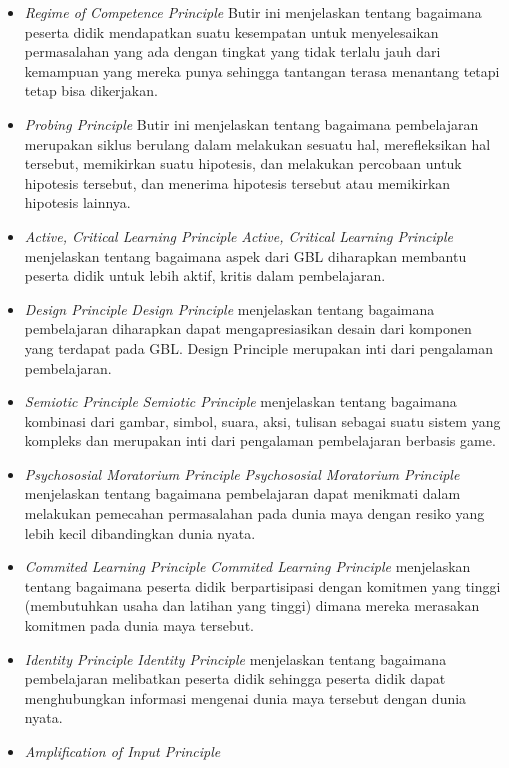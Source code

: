 	\begin{itemize}
		\item \textit{Regime of Competence Principle}
			\subitem Butir ini menjelaskan tentang bagaimana peserta didik mendapatkan suatu kesempatan untuk menyelesaikan permasalahan yang ada dengan tingkat yang tidak terlalu jauh dari kemampuan yang mereka punya sehingga tantangan terasa menantang tetapi tetap bisa dikerjakan.
		\item \textit{Probing Principle}
			\subitem Butir ini menjelaskan tentang bagaimana pembelajaran merupakan siklus berulang dalam melakukan sesuatu hal, merefleksikan hal tersebut, memikirkan suatu hipotesis, dan melakukan percobaan untuk hipotesis tersebut, dan menerima hipotesis tersebut atau memikirkan hipotesis lainnya.
		\item \textit{Active, Critical Learning Principle}
			\subitem \textit{Active, Critical Learning Principle} menjelaskan tentang bagaimana aspek dari GBL diharapkan membantu peserta didik untuk lebih aktif, kritis dalam pembelajaran.
		\item \textit{Design Principle}
			\subitem \textit{Design Principle} menjelaskan tentang bagaimana pembelajaran diharapkan dapat mengapresiasikan desain dari komponen yang terdapat pada GBL. Design Principle merupakan inti dari pengalaman pembelajaran.
		\item \textit{Semiotic Principle}
			\subitem \textit{Semiotic Principle} menjelaskan tentang bagaimana kombinasi dari gambar, simbol, suara, aksi, tulisan sebagai suatu sistem yang kompleks dan merupakan inti dari pengalaman pembelajaran berbasis game.
		\item \textit{Psychososial Moratorium Principle}
			\subitem \textit{Psychososial Moratorium Principle} menjelaskan tentang bagaimana pembelajaran dapat menikmati dalam melakukan pemecahan permasalahan pada dunia maya dengan resiko yang lebih kecil dibandingkan dunia nyata.
		\item \textit{Commited Learning Principle}
			\subitem \textit{Commited Learning Principle} menjelaskan tentang bagaimana peserta didik berpartisipasi dengan komitmen yang tinggi (membutuhkan usaha dan latihan yang tinggi) dimana mereka merasakan komitmen pada dunia maya tersebut.
		\item \textit{Identity Principle}
			\subitem \textit{Identity Principle} menjelaskan tentang bagaimana pembelajaran melibatkan peserta didik sehingga peserta didik dapat menghubungkan informasi mengenai dunia maya tersebut dengan dunia nyata.
		\item \textit{Amplification of Input Principle}

\end{itemize}
